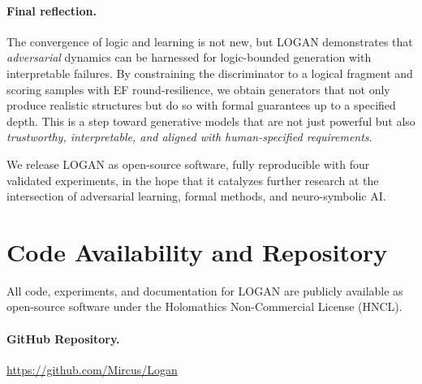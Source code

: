 \documentclass{article}
\begin{document}
\paragraph{Final reflection.}
The convergence of logic and learning is not new, but LOGAN demonstrates that \emph{adversarial} dynamics can be harnessed for logic-bounded generation with interpretable failures. By constraining the discriminator to a logical fragment and scoring samples with EF round-resilience, we obtain generators that not only produce realistic structures but do so with formal guarantees up to a specified depth. This is a step toward generative models that are not just powerful but also \emph{trustworthy, interpretable, and aligned with human-specified requirements}.

We release LOGAN as open-source software, fully reproducible with four validated experiments, in the hope that it catalyzes further research at the intersection of adversarial learning, formal methods, and neuro-symbolic AI.

\appendix

\section{Code Availability and Repository}

All code, experiments, and documentation for LOGAN are publicly available as open-source software under the Holomathics Non-Commercial License (HNCL).

\paragraph{GitHub Repository.}
\url{https://github.com/Mircus/Logan}
\end{document}
